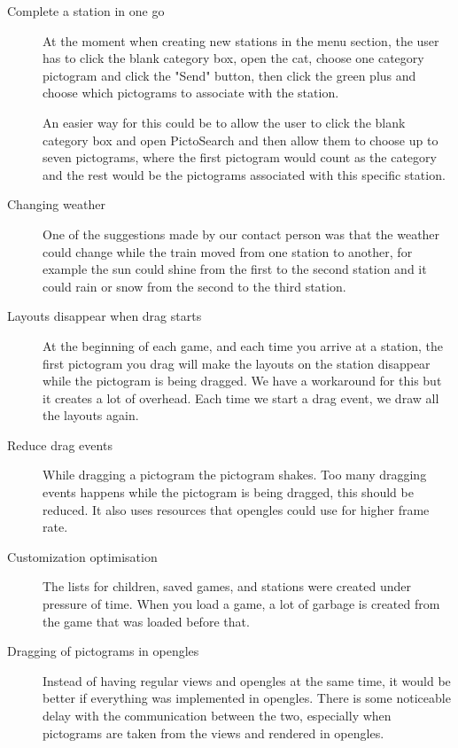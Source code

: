 \begin{description}
\item[Complete a station in one go] At the moment when creating new stations in the menu section, the user has to click the blank category box, open the \ac{cat}, choose one category pictogram and click the "Send" button, then click the green plus and choose which pictograms to associate with the station.

An easier way for this could be to allow the user to click the blank category box and open PictoSearch and then allow them to choose up to seven pictograms, where the first pictogram would count as the category and the rest would be the pictograms associated with this specific station.

\item[Changing weather] One of the suggestions made by our contact person was that the weather could change while the train moved from one station to another, for example the sun could shine from the first to the second station and it could rain or snow from the second to the third station. 

\item[Layouts disappear when drag starts] At the beginning of each game, and each time you arrive at a station, the first pictogram you drag will make the layouts on the station disappear while the pictogram is being dragged. We have a workaround for this but it creates a lot of overhead. Each time we start a drag event, we draw all the layouts again.

\item[Reduce drag events] While dragging a pictogram the pictogram shakes. Too many dragging events happens while the pictogram is being dragged, this should be reduced. It also uses resources that \ac{opengles} could use for higher frame rate.

\item[Customization optimisation] The lists for children, saved games, and stations were created under pressure of time. When you load a game, a lot of garbage is created from the game that was loaded before that.

\item[Dragging of pictograms in \ac{opengles}] Instead of having regular views and \linebreak \ac{opengles} at the same time, it would be better if everything was implemented in \ac{opengles}. There is some noticeable delay with the communication between the two, especially when pictograms are taken from the views and rendered in \ac{opengles}.


\end{description}
